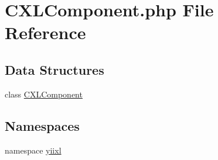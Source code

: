 \hypertarget{CXLComponent_8php}{
\section{CXLComponent.php File Reference}
\label{CXLComponent_8php}
}
\subsection*{Data Structures}
\begin{DoxyCompactItemize}
\item 
class \hyperlink{classCXLComponent}{CXLComponent}
\end{DoxyCompactItemize}
\subsection*{Namespaces}
\begin{DoxyCompactItemize}
\item 
namespace \hyperlink{namespaceyiixl}{yiixl}
\end{DoxyCompactItemize}
